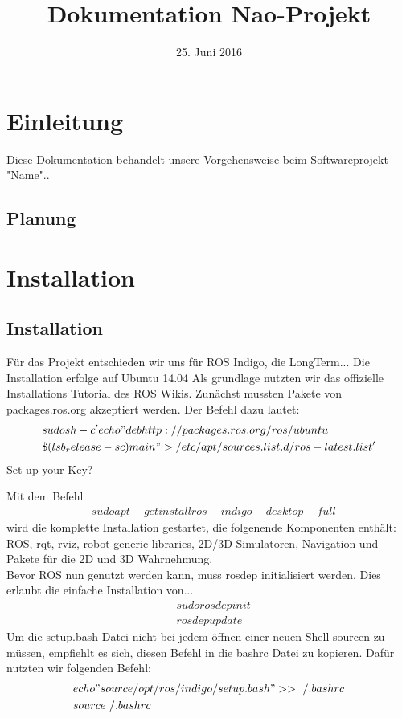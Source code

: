 \documentclass{scrartcl}
\title{Dokumentation Nao-Projekt}
\date{25. Juni 2016}
\begin{document}
\maketitle
\tableofcontents


\section{Einleitung}

Diese Dokumentation behandelt unsere Vorgehensweise beim Softwareprojekt "Name"..

\subsection{Planung}

\section{Installation}


\subsection{Installation}
Für das Projekt entschieden wir uns für ROS Indigo, die LongTerm... 
Die Installation erfolge auf Ubuntu 14.04 
Als grundlage nutzten wir das offizielle Installations Tutorial des ROS Wikis.
Zunächst mussten Pakete von packages.ros.org akzeptiert werden. Der Befehl dazu lautet: 
\begin{align}
&sudo sh -c 'echo "deb http://packages.ros.org/ros/ubuntu \\ 
&\$(lsb_release -sc) main" > /etc/apt/sources.list.d/ros-latest.list'
\end{align}
Set up your Key?

Mit dem Befehl 
\begin{align}
&sudo apt-get install ros-indigo-desktop-full
\end{align}
wird die komplette Installation gestartet, die folgenende Komponenten enthält: ROS, rqt, rviz, robot-generic libraries, 2D/3D Simulatoren, Navigation und Pakete für die 2D und 3D Wahrnehmung.
\\

Bevor ROS nun genutzt werden kann, muss rosdep initialisiert werden. Dies erlaubt die einfache Installation von...
\begin{align}
&sudo rosdep init\\
&rosdep update
\end{align}
Um die setup.bash Datei nicht bei jedem öffnen einer neuen Shell sourcen zu müssen, empfiehlt es sich, diesen Befehl in die bashrc Datei zu kopieren.
Dafür nutzten wir folgenden Befehl:
\begin{align}
&echo "source /opt/ros/indigo/setup.bash" >> ~/.bashrc\\
&source ~/.bashrc
\end{align}
\end{document}
